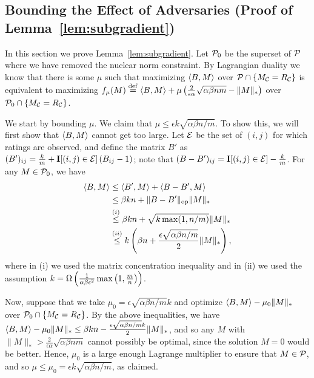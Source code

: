 \subsection{Bounding the Effect of Adversaries (Proof of Lemma~\ref{lem:subgradient})}
\label{sec:subgradient-proof}
In this section we prove Lemma~\ref{lem:subgradient}.
Let $\mathcal{P}_0$ be the superset of $\mathcal{P}$ where we have removed the 
nuclear norm constraint. By Lagrangian duality we 
know that there is some $\mu$ such that maximizing 
$\langle B, M \rangle$ over $\mathcal{P} \cap \{M_{\mathcal{C}} = R_{\mathcal{C}}\}$ 
is equivalent to maximizing $f_\mu(M) \stackrel{\rm def}{=} \langle B, M \rangle + \mu\left( \frac{2}{\epsilon\alpha}\sqrt{\alpha\beta nm} - \|M\|_* \right)$ over 
$\mathcal{P}_0 \cap \{M_{\mathcal{C}} = R_{\mathcal{C}}\}$. 

We start by bounding $\mu$. We claim that 
$\mu \leq \epsilon k \sqrt{\alpha\beta n/m}$. 
To show this, we will first show that $\langle B, M \rangle$ cannot get 
too large. Let $\mathcal{E}$ be the set of $(i,j)$ for which ratings are observed, 
and define the matrix $B'$ as 
$(B')_{ij} = \frac{k}{m} + \mathbf{I}[(i,j) \in \mathcal{E}]\left( B_{ij} - 1 \right)$; note 
that $(B-B')_{ij} = \mathbf{I}[(i,j) \in \mathcal{E}] - \frac{k}{m}$.
For any $M \in \mathcal{P}_0$, we have 
\begin{align}
\langle B, M \rangle &\leq \langle B', M \rangle + \langle B - B', M \rangle \\
 &\leq \beta kn + \|B - B'\|_{\mathrm{op}}\|M\|_* \\
 &\stackrel{(i)}{\leq} \beta kn + \sqrt{k\max(1, n/m)}\|M\|_* \\
 &\stackrel{(ii)}{\leq} k\left( \beta n + \frac{\epsilon\sqrt{\alpha\beta n/m}}{2} \|M\|_* \right),
\end{align}
where in (i) we used the matrix concentration inequality  and in (ii) 
we used the assumption $k = \Omega\left( \frac{1}{\alpha\beta\epsilon^2}\max\left( 1,\frac{m}{n} \right) \right)$.

Now, suppose that we take $\mu_0 = \epsilon \sqrt{\alpha\beta n/m}k$ and optimize $\langle B, M \rangle - \mu_0\|M\|_*$ over 
$\mathcal{P}_0 \cap \{M_{\mathcal{C}} = R_{\mathcal{C}}\}$. By the above inequalities, 
we have $\langle B, M \rangle - \mu_0\|M\|_* \leq \beta kn - \frac{\epsilon \sqrt{\alpha\beta n/m}k}{2}\|M\|_*$, 
and so any $M$ with $\|M\|_* > \frac{2}{\epsilon\alpha}\sqrt{\alpha\beta nm}$ 
cannot possibly be optimal, since the solution $M = 0$ would 
be better. Hence, $\mu_0$ is a large enough Lagrange multiplier to ensure that $M \in \mathcal{P}$, and so 
$\mu \leq \mu_0 = \epsilon k\sqrt{\alpha\beta n/m}$, as claimed.

